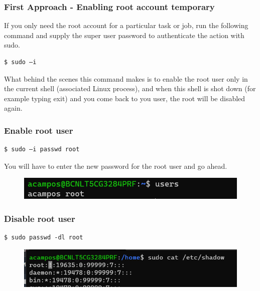 \documentclass{article}
\newenvironment{codetemplate}[1][]{%
  \mybasecolorbox[#1]
  \itshape
}{%
  \endmybasecolorbox
}
\begin{document}
\subsubsection{First Approach - Enabling root account temporary}
If you only need the root account for a particular task or job, run the following command and supply the super user password to authenticate the action with sudo.
\begin{codetemplate}{}
\begin{verbatim}
$ sudo –i
\end{verbatim}
\end{codetemplate}

What behind the scenes this command makes is to enable the root user only in the current shell (associated Linux process), and when this shell is shot down (for example typing exit) and you come back to you user, the root will be disabled again.

\subsubsection{Enable root user}
\begin{codetemplate}{}
\begin{verbatim}
$ sudo –i passwd root
\end{verbatim}
\end{codetemplate}

You will have to enter the new password for the root user and go ahead.

\begin{figure}[H]
    \includegraphics[scale=0.8]{pictures/su.png}
    \centering
\end{figure}

\subsubsection{Disable root user}
\begin{codetemplate}{}
\begin{verbatim}
$ sudo passwd -dl root
\end{verbatim}
\end{codetemplate}

\begin{figure}[H]
    \includegraphics[scale=0.7]{pictures/nopwdsu.png}
    \centering
\end{figure}
\end{document}
